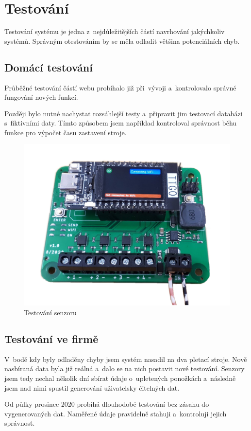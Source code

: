 \chapter{Testování}
Testování systému je jedna z~nejdůležitějších částí navrhování jakýchkoliv systémů.
Správným otestováním by se měla odladit většina potenciálních chyb.



\section{Domácí testování}
Průběžné testování částí webu probíhalo již při~vývoji a~kontrolovalo správné fungování nových funkcí.

Později bylo nutné nachystat rozsáhlejší testy a~připravit jim testovací databázi s~fiktivními daty.
Tímto způsobem jsem například kontroloval správnost běhu funkce pro výpočet času zastavení stroje.

\begin{figure}[htbp]
    \centering
    \includegraphics[width=\textwidth]{img/Testovani.png}
    \caption{Testování senzoru}
    \label{fig:SenzorNaStroji}
\end{figure}

\section{Testování ve firmě}
V~bodě kdy byly odladěny chyby jsem systém nasadil na dva pletací stroje.
Nově nasbíraná data byla již reálná a~dalo se na nich postavit nové testování.
Senzory jsem tedy nechal několik dní sbírat údaje o~upletených ponožkách a~následně jsem nad nimi spustil generování uživatelsky čitelných dat.

Od půlky prosince 2020 probíhá dlouhodobé testování bez zásahu do vygenerovaných dat. Naměřené údaje pravidelně stahuji a~kontroluji jejich správnost.

\newpage